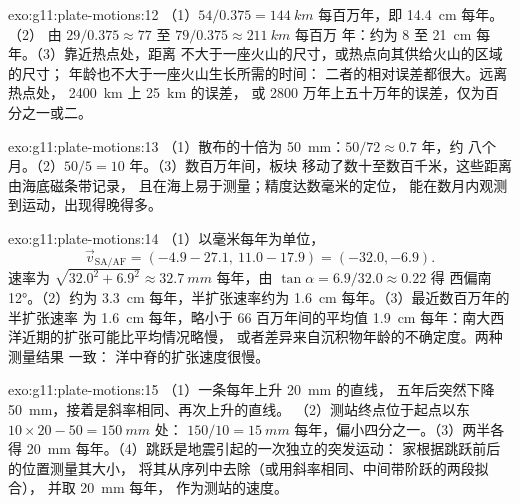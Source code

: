 \begin{solution}{exo:g11:plate-motions:12}
（1）$54/0.375 = \qty{144}{km}$ 每百万年，即 \qty{14.4}{cm} 每年。（2）
由 $29/0.375 \approx 77$ 至 $79/0.375 \approx \qty{211}{km}$ 每百万
年：约为 8 至 \qty{21}{cm} 每年。（3）靠近热点处，距离
不大于一座火山的尺寸，或热点向其供给火山的区域的尺寸；
年龄也不大于一座火山生长所需的时间：
二者的相对误差都很大。远离热点处，
\qty{2400}{km} 上 \qty{25}{km} 的误差，
或 2800 万年上五十万年的误差，仅为百分之一或二。
\end{solution}

\begin{solution}{exo:g11:plate-motions:13}
（1）散布的十倍为 \qty{50}{mm}：$50/72 \approx 0.7$ 年，约
八个月。（2）$50/5 = 10$ 年。（3）数百万年间，板块
移动了数十至数百千米，这些距离由海底磁条带记录，
且在海上易于测量；精度达数毫米的定位，
能在数月内观测到运动，出现得晚得多。
\end{solution}

\begin{solution}{exo:g11:plate-motions:14}
（1）以毫米每年为单位，
\[
  \vec v_{\mathrm{SA/AF}} = (-4.9 - 27.1,\ 11.0 - 17.9) = (-32.0, -6.9).
\] 速率为 $\sqrt{32.0^2 + 6.9^2} \approx
\qty{32.7}{mm}$ 每年，由 $\tan\alpha = 6.9/32.0 \approx 0.22$ 得
西偏南 \ang{12}。（2）约为 \qty{3.3}{cm}
每年，半扩张速率约为 \qty{1.6}{cm} 每年。（3）最近数百万年的半扩张速率
为 \qty{1.6}{cm} 每年，略小于
66 百万年间的平均值 \qty{1.9}{cm} 每年：南大西洋近期的扩张可能比平均情况略慢，
或者差异来自沉积物年龄的不确定度。两种测量结果
一致：
洋中脊的扩张速度很慢。
\end{solution}

\begin{solution}{exo:g11:plate-motions:15}
（1）一条每年上升 \qty{20}{mm} 的直线，
五年后突然下降 \qty{50}{mm}，接着是斜率相同、再次上升的直线。
（2）测站终点位于起点以东 $10 \times 20 - 50 = \qty{150}{mm}$ 处：
$150/10 = \qty{15}{mm}$ 每年，偏小四分之一。（3）两半各得
\qty{20}{mm} 每年。（4）跳跃是地震引起的一次独立的突发运动：
家根据跳跃前后的位置测量其大小，
将其从序列中去除（或用斜率相同、中间带阶跃的两段拟合），
并取 \qty{20}{mm} 每年，
作为测站的速度。
\end{solution}

